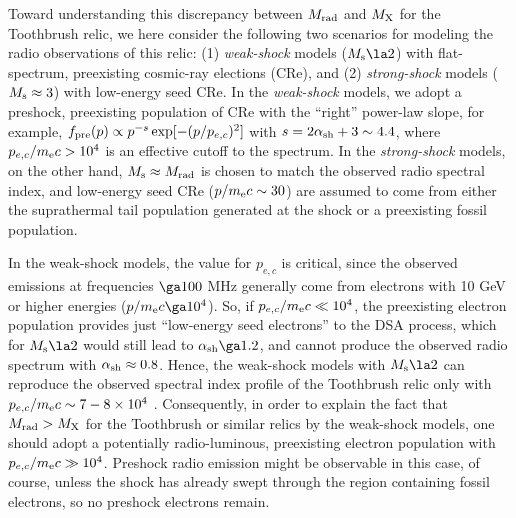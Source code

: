 \documentclass[twocolumn]{aastex61}
\begin{document}
Toward understanding this discrepancy between $M_{\rm rad}$ and $M_{\rm X}$ for the Toothbrush relic, we here consider the following two scenarios for modeling the radio observations of this relic:
(1) {\it weak-shock} models ($M_{\rm s}\la 2$) with flat-spectrum, preexisting cosmic-ray elections (CRe), and
(2) {\it strong-shock} models ($M_{\rm s}\approx 3$) with low-energy seed CRe.
In the {\it weak-shock} models, 
we adopt a preshock, preexisting population of CRe with the ``right'' power-law slope, for example, 
$f_{\rm pre}(p)\propto p^{-s} \exp[-(p/p_{e,c})^2]$ with $s= 2\alpha_{\rm sh} + 3 \sim 4.4$, where $p_{e,c}/ m_{\rm e} c>10^4$ 
is an effective cutoff to the spectrum.
In the {\it strong-shock} models, on the other hand, $M_{\rm s}\approx M_{\rm rad}$ is chosen to match the observed radio 
spectral index, and low-energy seed CRe ($p/ m_{\rm e} c\sim 30$) are assumed to come from 
either the suprathermal tail population generated at the shock or a preexisting fossil population.

In the weak-shock models, the value for $p_{e,c}$ is critical, 
since the observed emissions at frequencies $\ga 100$ MHz generally come from electrons with 10 GeV or higher energies ($p/ m_{\rm e} c\ga 10^4$). 
So, if $p_{e,c}/ m_{\rm e} c\ll 10^4$, the preexisting electron population provides just ``low-energy seed electrons'' 
to the DSA process, which for $M_{\rm s} \la 2$ would still lead to $\alpha_{\rm sh} \ga 1.2$, and cannot produce the observed radio spectrum with $\alpha_{\rm sh}\approx 0.8$.
Hence, the weak-shock models with $M_{\rm s}\la 2$ can reproduce the observed spectral 
index profile of the Toothbrush relic only with $p_{e,c}/ m_{\rm e} c\sim 7-8\times 10^4$ \citep{kang16a}.
Consequently, in order to explain the fact that $M_{\rm rad}>M_{\rm X}$ for the Toothbrush or similar relics 
by the weak-shock models,
one should adopt a potentially radio-luminous, preexisting electron population with $p_{e,c}/ m_{\rm e} c\gg10^4$.
Preshock radio emission might be observable in this case, of course, unless the shock has already swept through
the region containing fossil electrons, so no preshock electrons remain.
\end{document}
